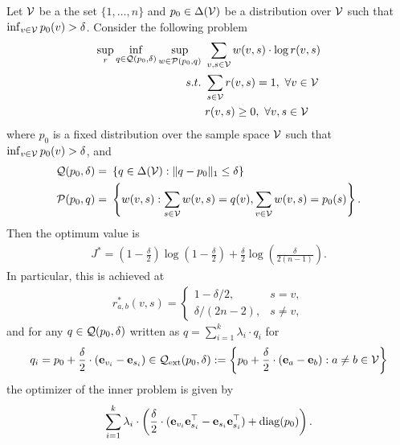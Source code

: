 \begin{proposition}\label{prop:reform-problem}
Let $\mathcal{V}$ be a the set $\{1,\dots,n\}$ and $p_0 \in \Delta(\mathcal{V})$ be a distribution over $\mathcal{V}$ such that $\inf_{v \in \mathcal{V}}p_0(v) > \delta$. Consider the following problem
\begin{align}\label{eq:gen_opt_reform}
    \sup_{r} \inf_{q \in \mathcal{Q}(p_0,\delta)} \sup_{w \in \mathcal{P}(p_0,q)} &~  \sum_{v,s \in \mathcal{V}} w(v,s) \cdot \log r(v,s) \\
    s.t. &~ \sum_{s \in \mathcal{V}} r(v,s) = 1, ~ \forall v \in \mathcal{V}\\
    &~ r(v,s) \geq 0,~ \forall v,s \in \mathcal{V} \notag 
\end{align}
where $p_0$ is a fixed distribution over the sample space $\mathcal{V}$ such that $\inf_{v \in \mathcal{V}}p_0(v) > \delta$, and
\begin{align*}
    \mathcal{Q}(p_0,\delta) = &~ \left\{q \in \Delta(\mathcal{V}): \|q - p_0\|_1 \leq \delta\right\} \\
    \mathcal{P}(p_0,q) = &~ \left\{w(v,s): \sum_{s \in \mathcal{V}}w(v,s) = q(v), \sum_{v  \in \mathcal{V}}w(v,s) =  p_0(s)\right\}.
\end{align*}
Then the optimum value is
\begin{align*}
J^*
= (1-\tfrac{\delta}{2})\log\left(1-\frac{\delta}{2}\right)
 + \tfrac{\delta}{2}\log\left(\frac{\delta}{2(n-1)}\right).
\end{align*}
In particular, this is achieved at
\begin{align*}
r^*_{a,b}(v,s)
=
\begin{cases}
1-\delta/2, & s=v,\\
\delta/(2n-2), & s\neq v,
\end{cases}
\end{align*}
and for any $q \in \mathcal{Q}(p_0,\delta)$ written as $q = \sum_{i=1}^k \lambda_i \cdot q_i$ for 
$$q_i = p_0 + \frac{\delta}{2}\cdot (\mathbf{e}_{v_i} - \mathbf{e}_{s_i}) \in \mathcal{Q}_{\mathrm{ext}}(p_0,\delta) := \left\{p_0 + \frac{\delta}{2}\cdot (\mathbf{e}_a - \mathbf{e}_b): a \neq b \in \mathcal{V}\right\}$$
the optimizer of the inner problem is given by
\begin{align*}
    \sum_{i=1}^k \lambda_i \cdot \left(\frac{\delta}{2} \cdot (\mathbf{e}_{v_i}\mathbf{e}_{s_i}^\top - \mathbf{e}_{s_i}\mathbf{e}_{s_i}^\top) + \mathrm{diag}(p_0)\right).
\end{align*}
\end{proposition}

